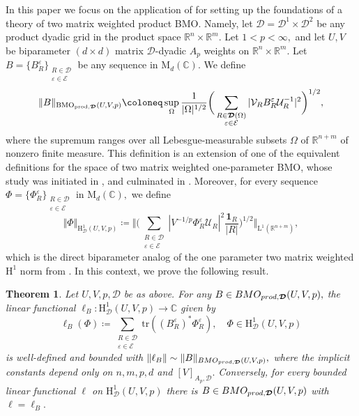 \documentclass{article}
\newtheorem{theorem}{Theorem}
\theoremstyle{definition}
\theoremstyle{remark}
\numberwithin{equation}{section}
\newcommand{\cD}{\mathcal{D}}
\newcommand{\cE}{\mathcal{E}}
\newcommand{\cU}{\mathcal{U}}
\newcommand{\cV}{\mathcal{V}}
\newcommand{\bfD}{\bm{\mathcal{D}}}
\newcommand{\e}{\varepsilon}
\newcommand{\reals}{\mathbb{R}}
\newcommand{\complex}{\mathbb{C}}
\newcommand{\Lp}[1]{\mathrm{L}^{#1}}
\newcommand{\1}{\mathbf{1}}
\newcommand{\BMOprodD}{\ensuremath\text{BMO}_{\text{prod},\bfD}}
\begin{document}
    In this paper we focus on the application of  for setting up the foundations of a theory of two matrix weighted product BMO. Namely, let $\bfD=\cD^1\times\cD^2$ be any product dyadic grid in the product space $\reals^n\times\reals^m.$ Let $1<p<\infty,$ and let $U,V$ be biparameter $(d\times d)$ matrix $\bfD$-dyadic $A_p$ weights on $\reals^n\times\reals^m.$ Let $B=\{B_{R}^{\e}\}_{\substack{R\in\bfD\\\e\in\cE}}$ be any sequence in $\mathrm{M}_{d}(\complex).$ We define
    \begin{equation*}
        \Vert B\Vert_{\BMOprodD(U,V,p)}\coloneq \sup_{\Omega}\frac{1}{|\Omega|^{1/2}}\bigg(\sum_{\substack{R\in\bfD(\Omega)\\\e\in\cE}}|\cV_{R}B_{R}^{\e}\cU_{R}^{-1}|^2\bigg)^{1/2},
    \end{equation*}
    where the supremum ranges over all Lebesgue-measurable subsets $\Omega$ of $\reals^{n+m}$ of nonzero finite measure. This definition is an extension of one of the equivalent definitions for the space of two matrix weighted one-parameter BMO, whose study was initiated in \cite{Isralowitz_Kwon_Pott2017}, \cite{Isralowitz_2017} and culminated in \cite{Isralowitz_Pott_Treil_2022}. Moreover, for every sequence $\Phi=\{\Phi_{R}^{\e}\}_{\substack{R\in\bfD\\\e\in\cE}}$ in $\mathrm{M}_{d}(\complex),$ we define
    \begin{equation*}
        \Vert\Phi\Vert_{\mathrm{H}^1_{\bfD}(U,V,p)}\coloneq \bigg\Vert\bigg(\sum_{\substack{R\in\bfD\\\e\in\cE}}|V^{-1/p}\Phi_{R}^{\e}\cU_{R}|^2\frac{\1_{R}}{|R|}\bigg)^{1/2}\bigg\Vert_{\Lp{1}(\reals^{n+m})},
    \end{equation*}
    which is the direct biparameter analog of the one parameter two matrix weighted $\mathrm{H}^1$ norm from \cite{Isralowitz_2017}.
    In this context, we prove the following result.

    \begin{theorem}
        \label{thm:H1BMOduality}
        Let $U,V,p,\bfD$ be as above. For any $B\in\emph{BMO}_{\emph{prod},\bfD}(U,V,p),$ the linear functional $\ell_{B}:\mathrm{H}^1_{\bfD}(U,V,p)\rightarrow\complex$ given by
        \begin{equation*}
            \ell_{B}(\Phi)\coloneq \sum_{\substack{R\in\bfD\\\e\in\cE}}\mathrm{tr}((B_{R}^{\e})^{\ast}\Phi_{R}^{\e}),\quad \Phi\in \mathrm{H}^1_{\bfD}(U,V,p)
        \end{equation*}
        is well-defined and bounded with $\Vert\ell_{B}\Vert\sim\Vert B\Vert_{\emph{BMO}_{\emph{prod},\bfD}(U,V,p)},$ where the implicit constants depend only on $n,m,p,d$ and $[V]_{A_p,\bfD}.$ Conversely, for every bounded linear functional $\ell$ on $\mathrm{H}^1_{\bfD}(U,V,p)$ there is $B\in\emph{BMO}_{\emph{prod},\bfD}(U,V,p)$ with $\ell=\ell_{B}.$
    \end{theorem}
\end{document}

